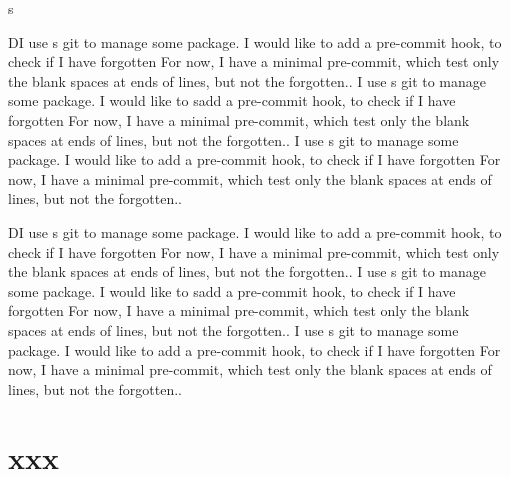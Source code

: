\documentclass[a4paper, twoside, 12pt]{book}
\begin{document}
s
\newpage

\beginnumbering
\beforeeledchapter
\pstart
{}
\pend
\pstart
DI use s git to manage some package.
I would like to add a pre-commit hook, to check if I have forgotten
For now, I have a minimal pre-commit, which test only the blank spaces at ends of lines, but not the forgotten..
\pend
\pstart
{}
\pend
\pstart
{}
\pend
\pstart
{}
\pend
\pstart
{}I use s git to manage some package.
I would like to  {s}add a pre-commit hook, to check if I have forgotten
For now, I have a minimal pre-commit, which test only the blank spaces at ends of lines, but not the forgotten..
\pend
\pstart
{}
\pend
\pstart
{}I use s git to manage some package.
I would like to add a pre-commit hook, to check if I have forgotten
For now, I have a minimal pre-commit, which test only the blank spaces at ends of lines, but not the forgotten..
\pend

\beforeeledchapter
\pstart
{}
\pend
\pstart
DI use s git to manage some package.
I would like to add a pre-commit hook, to check if I have forgotten
For now, I have a minimal pre-commit, which test only the blank spaces at ends of lines, but not the forgotten..
\pend
\pstart
{}
\pend
\pstart
{}
\pend
\pstart
{}
\pend
\pstart
{}I use s git to manage some package.
I would like to  {s}add a pre-commit hook, to check if I have forgotten
For now, I have a minimal pre-commit, which test only the blank spaces at ends of lines, but not the forgotten..
\pend
\pstart
{}
\pend
\pstart
{}I use s git to manage some package.
I would like to add a pre-commit hook, to check if I have forgotten
For now, I have a minimal pre-commit, which test only the blank spaces at ends of lines, but not the forgotten..
\pend


\endnumbering

\newpage
\section*{xxx}
\end{document}

